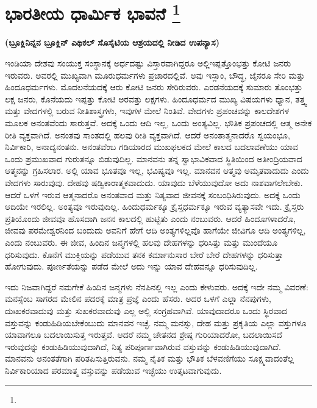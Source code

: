 
\chapter[ಭಾರತೀಯ ಧಾರ್ಮಿಕ ಭಾವನೆ ]{ಭಾರತೀಯ ಧಾರ್ಮಿಕ ಭಾವನೆ \protect\footnote{}}

\centerline{\textbf{(ಬ್ರೂಕ್ಲಿನಿನ್ನನ ಬ್ರೂಕ್ಲಿನ್​ ಎಥಿಕಲ್​ ಸೊಸೈಟಿಯ ಆಶ್ರಯದಲ್ಲಿ ನೀಡಿದ ಉಪನ್ಯಾಸ)}}

ಇಂಡಿಯಾ ದೇಶವು ಸಂಯುಕ್ತ ಸಂಸ್ಥಾನಕ್ಕೆ ಅರ್ಧದಷ್ಟು ವಿಸ್ತಾರವಾಗಿದ್ದರೂ ಅಲ್ಲಿ\break ಇಪ್ಪತ್ತೊಂಭತ್ತು ಕೋಟಿ ಜನರು ಇರುವರು. ಅವರಲ್ಲಿ ಮುಖ್ಯವಾಗಿ ಮೂರು\break ಧರ್ಮಗಳು ಪ್ರಚಾರದಲ್ಲಿವೆ. ಅವು ಇಸ್ಲಾಂ, ಬೌದ್ಧ, ಜೈನರೂ ಸೇರಿ ಮತ್ತು ಹಿಂದೂಧರ್ಮಗಳು. ಮೊದಲನೆಯದಕ್ಕೆ ಆರು ಕೋಟಿ ಜನರು ಸೇರಿರುವರು. ಎರಡನೆಯದಕ್ಕೆ ಸುಮಾರು ತೊಂಭತ್ತು ಲಕ್ಷ ಜನರು, ಕೊನೆಯದು ಇಪ್ಪತ್ತು ಕೋಟಿ ಅರವತ್ತು ಲಕ್ಷಗಳು. ಹಿಂದೂಧರ್ಮದ ಮುಖ್ಯ ವಿಷಯಗಳು ಧ್ಯಾನ, ತತ್ತ್ವ ಮತ್ತು ವೇದಗಳಲ್ಲಿ ಬರುವ ನೀತಿಶಾಸ್ತ್ರಗಳು, ಇವುಗಳ ಮೇಲೆ ನಿಂತಿವೆ. ವೇದಗಳು ಪ್ರಪಂಚವನ್ನು ಕಾಲದೇಶಗಳ ಮೂಲಕ ಅನಂತವೆಂದು ಸಾರುತ್ತವೆ. ಅದಕ್ಕೆ ಒಂದು ಆದಿ ಇಲ್ಲ, ಒಂದು ಅಂತ್ಯವಿಲ್ಲ. ಭೌತಿಕ ಪ್ರಪಂಚದಲ್ಲಿ ಆತ್ಮ ಅನೇಕ ರೀತಿ ವ್ಯಕ್ತವಾಗಿದೆ. ಅನಂತವು ಸಾಂತದಲ್ಲಿ ಹಲವು ರೀತಿ ವ್ಯಕ್ತವಾಗಿದೆ. ಆದರೆ ಅನಂತಾತ್ಮನಾದರೊ ಸ್ವಯಂಭೂ, ನಿರ್ವಿಕಾರಿ, ಅನಾದ್ಯನಂತನು. ಅನಂತವೆಂಬ ಗಡಿಯಾರದ ಮುಖಫಲಕದ ಮೇಲೆ ಕಾಲದ ಬದಲಾವಣೆಯು ಯಾವ ಒಂದು ಪ್ರಮುಖವಾದ ಗುರುತನ್ನೂ ಬಿಡುವುದಿಲ್ಲ. ಮಾನವನು ತನ್ನ ಸ್ವಾಭಾವಿಕವಾದ ಸ್ಥಿತಿಯಿಂದ ಅತೀಂದ್ರಿಯವಾದ ಆತ್ಮನನ್ನು ಗ್ರಹಿಸಲಾರ. ಅಲ್ಲಿ ಯಾವ ಭೂತವೂ ಇಲ್ಲ, ಭವಿಷ್ಯವೂ ಇಲ್ಲ. ಮಾನವನ ಆತ್ಮವು ಅಮೃತವಾದುದು ಎಂದು ವೇದಗಳು ಸಾರುವುವು. ದೇಹವು ಷಡ್ವಿಕಾರಾತ್ಮಕವಾದುದು. ಯಾವುದು ಬೆಳೆಯುವುದೋ ಅದು ನಾಶವಾಗಲೇಬೇಕು. ಆದರೆ ಒಳಗೆ ಇರುವ ಆತ್ಮನಾದರೊ ಅನಂತವಾದ ಮತ್ತು ನಿತ್ಯವಾದ ಜೀವನಕ್ಕೆ ಸಂಬಂಧಿಸಿರುವುದು. ಅದಕ್ಕೆ ಒಂದು ಆದಿಯೇ ಇರಲಿಲ್ಲ. ಅಂತ್ಯವೂ ಇರುವುದಿಲ್ಲ. ಹಿಂದುಧರ್ಮಕ್ಕೂ ಕ್ರೈಸ್ತಧರ್ಮಕ್ಕೂ ಇರುವ ವ್ಯತ್ಯಾಸವೇ ಇದು. ಕ್ರೈಸ್ತರು ಪ್ರತಿಯೊಂದು ಜೀವವೂ ಹೊಸದಾಗಿ ಜನನ ಕಾಲದಲ್ಲಿ ಹುಟ್ಟಿತು ಎಂದು ನಂಬುವರು. ಆದರೆ ಹಿಂದೂಗಳಾದರೊ, ಜೀವವು ಪರಮೇಶ್ವರನಿಂದ ಬಂದುದು ಅವನಿಗೆ ಹೇಗೆ ಆದಿ ಅಂತ್ಯಗಳಿಲ್ಲವೊ ಹಾಗೆಯೇ ಜೀವಿಗೂ ಆದಿ ಅಂತ್ಯಗಳಿಲ್ಲ, ಎಂದು ನಂಬುವರು. ಈ ಜೀವ, ಹಿಂದಿನ ಜನ್ಮಗಳಲ್ಲಿ ಹಲವು ದೇಹಗಳನ್ನು ಧರಿಸಿತ್ತು ಮತ್ತು ಮುಂದೆಯೂ ಧರಿಸುವುದು. ಕೊನೆಗೆ ಮುಕ್ತಿಯನ್ನು ಪಡೆಯುವ ತನಕ ಕರ್ಮಾನುಸಾರ ಬೇರೆ ಬೇರೆ ದೇಹಗಳನ್ನು ಧರಿಸುತ್ತಾ ಹೋಗುವುದು. ಪೂರ್ಣತೆಯನ್ನು ಪಡೆದ ಮೇಲೆ ಅದು ಇನ್ನು ಯಾವ ದೇಹವನ್ನೂ ಧರಿಸುವುದಿಲ್ಲ.

ಇದು ನಿಜವಾಗಿದ್ದರೆ ನಮಗೇಕೆ ಹಿಂದಿನ ಜನ್ಮಗಳು ನೆನಪಿನಲ್ಲಿ ಇಲ್ಲ ಎಂದು ಕೇಳುವರು. ಅದಕ್ಕೆ ಇದೇ ನಮ್ಮ ವಿವರಣೆ: ಮನಸ್ಸೆಂಬ ಸಾಗರದ ಮೇಲಿನ ಪದರಕ್ಕೆ ಮಾತ್ರ ಪ್ರಜ್ಞೆ ಎಂದು ಹೆಸರು. ಅದರ ಒಳಗೆ ಎಲ್ಲಾ ನೆನಪುಗಳು, ದುಃಖಕರವಾದುವು ಮತ್ತು ಸುಖಕರವಾದುವು ಎಲ್ಲ ಅಲ್ಲಿ ಸಂಗ್ರಹವಾಗಿವೆ. ಯಾವುದಾದರೂ ಒಂದು ಸ್ಥಿರವಾದ ವಸ್ತುವನ್ನು ಕಂಡುಹಿಡಿಯಬೇಕೆಂಬುದು ಮಾನವನ ಇಚ್ಛೆ. ನಮ್ಮ ಮನಸ್ಸು, ದೇಹ ಮತ್ತು ಪ್ರಕೃತಿಯ ಎಲ್ಲಾ ವಸ್ತುಗಳೂ ಯಾವಾಗಲೂ ಬದಲಾಯಿಸುತ್ತ ಇರುತ್ತವೆ. ಆದರೆ ನಮ್ಮ ಚೇತನದ ಶ್ರೇಷ್ಠ ಗುರಿಯಾದರೋ, ಬದಲಾಯಿಸದೆ ಇರುವುದನ್ನು ಕಂಡುಹಿಡಿಯುವುದಾಗಿದೆ, ನಿತ್ಯ ಪರಿಪೂರ್ಣವಾಗಿರುವ ವಸ್ತುವನ್ನು ಕಂಡುಹಿಡಿಯುವುದಾಗಿದೆ. ಮಾನವನು ಅನಂತತೆಗಾಗಿ ಪರಿತಪಿಸುತ್ತಿರುವನು. ನಮ್ಮ ನೈತಿಕ ಮತ್ತು ಭೌತಿಕ ಬೆಳವಣಿಗೆಯು ಸೂಕ್ಷ್ಮವಾದಂತೆಲ್ಲ ನಿರ್ವಿಕಾರಿಯಾದ ಪರಮಾತ್ಮ ವಸ್ತುವನ್ನು ಪಡೆಯುವ ಇಚ್ಛೆಯು ಉತ್ಕಟವಾಗುವುದು.


